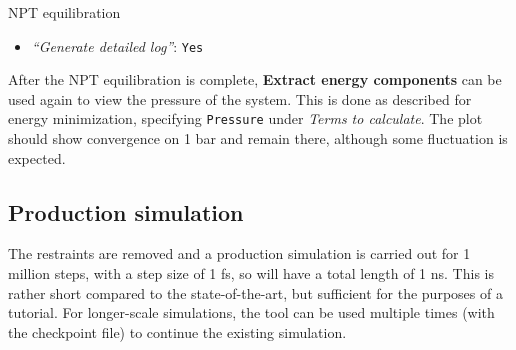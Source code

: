 \documentclass[twocolumn]{bmcart}%
\providecommand{\tightlist}{%
  \setlength{\itemsep}{0pt}\setlength{\parskip}{0pt}}
\begin{document}
\begin{handson_box_colour}{NPT
equilibration}
\begin{itemize}
\begin{itemize}
      \begin{itemize}
      \tightlist
      \item
        \emph{``Bond constraints (constraints)''}:
        \texttt{All\ bonds\ (all-bonds).}
      \item
        \emph{``Temperature /K''}: \texttt{300}
      \item
        \emph{``Step length in ps''}: \texttt{0.002}
      \item
        \emph{``Number of steps that elapse between saving data points
        (velocities, forces, energies)''}: \texttt{1000}
      \item
        \emph{``Number of steps for the simulation''}: \texttt{50000}
      \end{itemize}
    \end{itemize}
  \item
    \emph{``Generate detailed log''}: \texttt{Yes}
  \end{itemize}

\end{handson_box_colour}

After the NPT equilibration is complete, \textbf{Extract energy components} can be used again to view the pressure of the system. This is done as described for energy minimization, specifying \texttt{Pressure} under \emph{Terms to calculate}. The plot should show convergence on 1 bar and remain there, although some fluctuation is expected.

\subsection*{Production simulation}\label{production-simulation}

The restraints are removed and a production simulation is carried out for 1 million steps, with a step size of 1 fs, so will have a total length of 1 ns. This is rather short compared to the state-of-the-art, but sufficient for the purposes of a tutorial. For longer-scale simulations, the tool can be used multiple times (with the checkpoint file) to continue the existing simulation.
\end{document}
